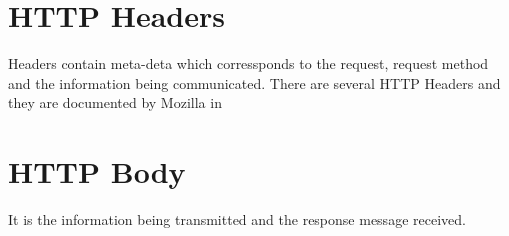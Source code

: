 \section{HTTP Headers}
Headers contain meta-deta which corressponds to the request, request method and the information being communicated. There are several HTTP Headers and they are documented by Mozilla in \cite{b17}
\section{HTTP Body}
It is the information being transmitted and the response message received.